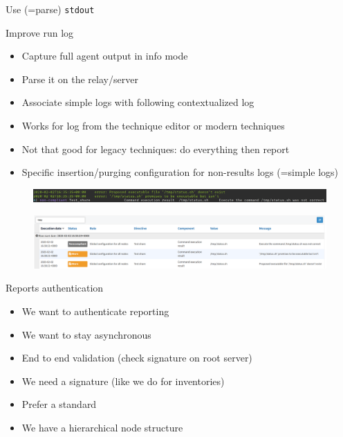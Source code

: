 \documentclass[aspectratio=169, 14pt]{beamer}
\begin{document}
\begin{frame}[standout]
	Use (=parse) \texttt{stdout}
\end{frame}

\begin{frame}{Improve run log}
	\begin{itemize}
		\item Capture full agent output in info mode
		\item Parse it on the relay/server
		\item Associate simple logs with following contextualized log
		\item Works for log from the technique editor or modern techniques
		\item Not that good for legacy techniques: do everything then report
		\item Specific insertion/purging configuration for non-results logs (=simple logs) 
	\end{itemize}
\end{frame}

\begin{frame}
	\begin{figure}
		\begin{center}
			\includegraphics[width=400pt]{output.png}
		\end{center}
	\end{figure}
	\begin{figure}
		\begin{center}
			\includegraphics[width=400pt]{status.png}
		\end{center}
	\end{figure}
\end{frame}

\begin{frame}{Reports authentication}
	\begin{itemize}
		\item We want to authenticate reporting
		\item We want to stay asynchronous
	\end{itemize}
	
		\begin{itemize}
		\item End to end validation (check signature on root server)
		\item We need a signature (like we do for inventories)
		\item Prefer a standard
		\item We have a hierarchical node structure
	\end{itemize}
\end{frame}
\end{document}
